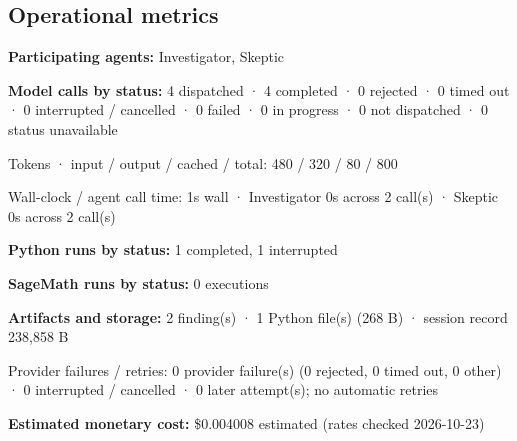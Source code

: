 \documentclass[11pt]{article}
\begin{document}
\subsection{Operational metrics}
\textbf{Participating agents:} Investigator, Skeptic\par
\textbf{Model calls by status:} 4 dispatched · 4 completed · 0 rejected · 0 timed out · 0 interrupted / cancelled · 0 failed · 0 in progress · 0 not dispatched · 0 status unavailable\par
Tokens · input / output / cached / total: 480 / 320 / 80 / 800\par
Wall-clock / agent call time: 1s wall · Investigator 0s across 2 call(s) · Skeptic 0s across 2 call(s)\par
\textbf{Python runs by status:} 1 completed, 1 interrupted\par
\textbf{SageMath runs by status:} 0 executions\par
\textbf{Artifacts and storage:} 2 finding(s) · 1 Python file(s) (268 B) · session record 238,858 B\par
Provider failures / retries: 0 provider failure(s) (0 rejected, 0 timed out, 0 other) · 0 interrupted / cancelled · 0 later attempt(s); no automatic retries\par
\textbf{Estimated monetary cost:} \$0.004008 estimated (rates checked 2026-10-23)\par
\end{document}
